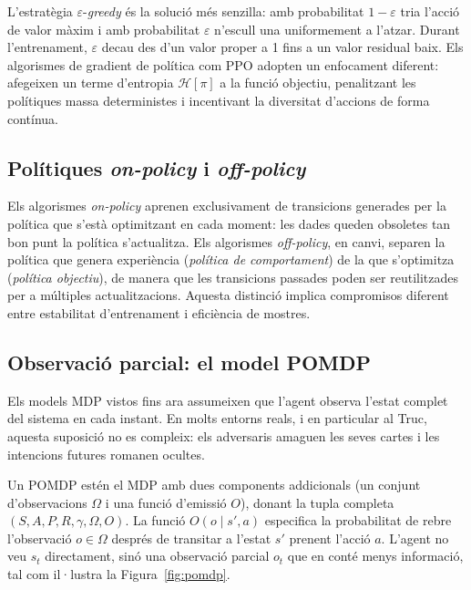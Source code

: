 L'estratègia $\varepsilon$-\emph{greedy} és la solució més senzilla: amb
probabilitat $1-\varepsilon$ tria l'acció de valor màxim i amb probabilitat
$\varepsilon$ n'escull una uniformement a l'atzar. Durant l'entrenament,
$\varepsilon$ decau des d'un valor proper a 1 fins a un valor residual baix.
Els algorismes de gradient de política com \ac{PPO} adopten un enfocament
diferent: afegeixen un terme d'entropia $\mathcal{H}[\pi]$ a la funció
objectiu, penalitzant les polítiques massa deterministes i incentivant la
diversitat d'accions de forma contínua.

\FloatBarrier
\subsection*{Polítiques \emph{on-policy} i \emph{off-policy}}

Els algorismes \emph{on-policy} aprenen exclusivament de transicions generades
per la política que s'està optimitzant en cada moment: les dades queden
obsoletes tan bon punt la política s'actualitza. Els algorismes
\emph{off-policy}, en canvi, separen la política que genera experiència
(\emph{política de comportament}) de la que s'optimitza (\emph{política
objectiu}), de manera que les transicions passades poden ser reutilitzades per
a múltiples actualitzacions. Aquesta distinció implica compromisos diferent
entre estabilitat d'entrenament i eficiència de mostres.

\FloatBarrier
\subsection*{Observació parcial: el model POMDP}

Els models \ac{MDP} vistos fins ara assumeixen que l'agent observa l'estat
complet del sistema en cada instant. En molts entorns reals, i en particular
al Truc, aquesta suposició no es compleix: els adversaris amaguen les seves
cartes i les intencions futures romanen ocultes.

Un \ac{POMDP} estén el \ac{MDP} amb dues components addicionals (un conjunt
d'observacions $\Omega$ i una funció d'emissió $O$), donant la tupla completa
$(S, A, P, R, \gamma, \Omega, O)$. La funció $O(o \mid s', a)$ especifica la
probabilitat de rebre l'observació $o \in \Omega$ després de transitar a
l'estat $s'$ prenent l'acció $a$. L'agent no veu $s_t$ directament, sinó una
observació parcial $o_t$ que en conté menys informació, tal com il·lustra la
Figura~\ref{fig:pomdp}.


